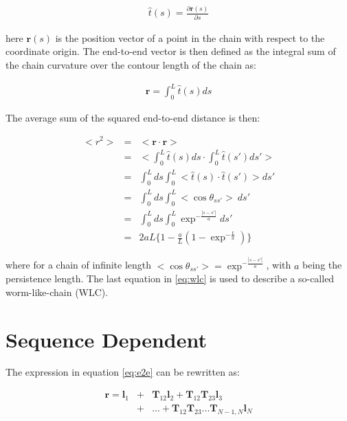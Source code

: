 \begin{gather}
\hat{t}(s)=\frac{\partial{\textbf{r}(s)}}{\partial{s}}
\end{gather}

here $\textbf{r}(s)$ is the position vector of a point in the chain
with respect to the coordinate origin.
The end-to-end vector is then defined as the integral sum of the chain
curvature over the contour length of the chain as:

\begin{gather}
\textbf{r}=\int_{0}^{L}\hat{t}(s)ds
\end{gather}

The average sum of the squared end-to-end distance is then:

\begin{eqnarray}
\label{eq:wlc}
<r^2> & = & <\textbf{r} \cdot \textbf{r}> \nonumber \\
               & = & <\int_{0}^{L}\hat{t}(s)ds \cdot \int_{0}^{L}\hat{t}(s')ds' >\nonumber \\
               & = & \int_{0}^{L} ds \int_{0}^{L}<\hat{t}(s) \cdot \hat{t}(s')>ds' \nonumber \\
               & = & \int_{0}^{L} ds \int_{0}^{L} <\cos{\theta}_{ss'}>~ ds' \nonumber \\
               & = & \int_{0}^{L} ds \int_{0}^{L} \exp^{-\frac{|s-s'|}{a}} ds' \nonumber \\
               & = & 2aL \{ 1 - \frac{a}{L}(1-\exp^{-\frac{L}{a}})\}
\end{eqnarray}

where  for   a  chain  of  infinite   length  $<\cos{\theta_{ss'}}>  =
\exp^{-\frac{|s-s'|}{a}}$, with $a$ being the persistence length.  The
last   equation  in   \ref{eq:wlc}   is  used   to   describe  a   so-called
worm-like-chain (WLC).

\section{Sequence Dependent}
The expression in equation \ref{eq:e2e} can be rewritten as:

\begin{eqnarray}
\label{eq:real1}  
\textbf{r} = \textbf{l}_{1} & + & \textbf{T}_{12}\textbf{l}_{2}
+\textbf{T}_{12}\textbf{T}_{23}\textbf{l}_{3} \nonumber \\
 & + & ... + \textbf{T}_{12}\textbf{T}_{23}...\textbf{T}_{N-1,N} \textbf{l}_{N}
\end{eqnarray}


